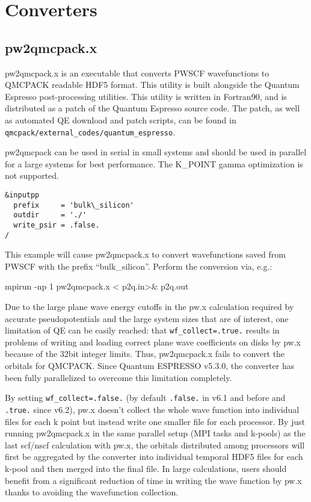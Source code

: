 \section{Converters} 
    
  \subsection{pw2qmcpack.x}
\label{sec:pw2qmcpack}
pw2qmcpack.x is an executable that converts PWSCF wavefunctions to QMCPACK readable 
HDF5 format.  This utility is built alongside the Quantum Espresso post-processing utilities.
This utility is written in Fortran90, and is distributed as a patch of the Quantum Espresso 
source code.  The patch, as well as automated QE download and patch scripts, can be found in 
\texttt{qmcpack/external\_codes/quantum\_espresso}.

pw2qmcpack can be used in serial in small systems and should be used in parallel for a large systems for best performance. The K\_POINT gamma optimization is not supported.

\begin{lstlisting}[caption={Sample \texttt{pw2qmcpack.x} input file \texttt{p2q.in}}]
&inputpp
  prefix     = 'bulk\_silicon'
  outdir     = './'
  write_psir = .false.
/
\end{lstlisting}

This example will cause pw2qmcpack.x to convert wavefunctions saved from PWSCF with the prefix ``bulk\_silicon''. Perform the conversion via, e.g.:

\begin{shade}
mpirun -np 1 pw2qmcpack.x < p2q.in>& p2q.out
\end{shade}

Due to the large plane wave energy cutoffs in the pw.x calculation required by accurate pseudopotentials and the large system sizes that are of interest, one limitation of QE can be easily reached:
that \texttt{wf\_collect=.true.} results in problems of writing and loading correct plane wave coefficients on disks by pw.x because of the 32bit integer limits. Thus, pw2qmcpack.x fails to convert the orbitals for QMCPACK. Since Quantum ESPRESSO v5.3.0, the converter has been fully parallelized to overcome this limitation completely.

By setting \texttt{wf\_collect=.false.} (by default \texttt{.false.} in v6.1 and before and \texttt{.true.} since v6.2), pw.x doesn't collect the whole wave function into individual files for each k point but instead write one smaller file for each processor.
By just running pw2qmcpack.x in the same parallel setup (MPI tasks and k-pools) as the last scf/nscf calculation with pw.x,
the orbitals distributed among processors will first be aggregated by the converter into individual temporal HDF5 files for each k-pool and then merged into the final file.
In large calculations, users should benefit from a significant reduction of time in writing the wave function by pw.x thanks to avoiding the wavefunction collection.

